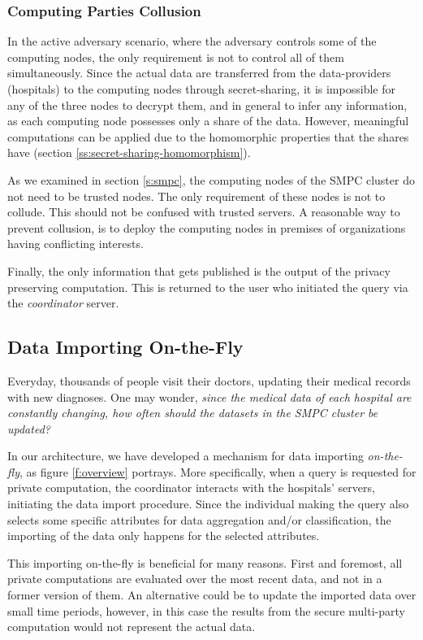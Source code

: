\subsubsection{Computing Parties Collusion}\label{s:computing-parties-collusion}
In the active adversary scenario, where the adversary controls some of the computing nodes, the only requirement is not to control all of them simultaneously.
Since the actual data are transferred from the data-providers (hospitals) to the computing nodes through secret\hyp sharing, it is impossible for any of the three nodes to decrypt them, and in general to infer any information, as each computing node possesses only a share of the data.
However, meaningful computations can be applied due to the homomorphic properties that the shares have (section \ref{ss:secret-sharing-homomorphism}).

As we examined in section \ref{s:smpc}, the computing nodes of the SMPC cluster do not need to be trusted nodes.
The only requirement of these nodes is not to collude.
This should not be confused with trusted servers.
A reasonable way to prevent collusion, is to deploy the computing nodes in premises of organizations having conflicting interests.

Finally, the only information that gets published is the output of the privacy preserving computation.
This is returned to the user who initiated the query via the \textit{coordinator} server.



\subsection{Data Importing On-the-Fly}\label{s:importing-otf}
Everyday, thousands of people visit their doctors, updating their medical records with new diagnoses.
One may wonder, \textit{since the medical data of each hospital are constantly changing, how often should the datasets in the SMPC cluster be updated?}

In our architecture, we have developed a mechanism for data importing \textit{on-the-fly}, as figure \ref{f:overview} portrays.
More specifically, when a query is requested for private computation, the coordinator interacts with the hospitals' servers, initiating the data import procedure.
Since the individual making the query also selects some specific attributes for data aggregation and/or classification, the importing of the data only happens for the selected attributes.

This importing on-the-fly is beneficial for many reasons.
First and foremost, all private computations are evaluated over the most recent data, and not in a former version of them.
An alternative could be to update the imported data over small time periods, however, in this case the results from the secure multi-party computation would not represent the actual data.

